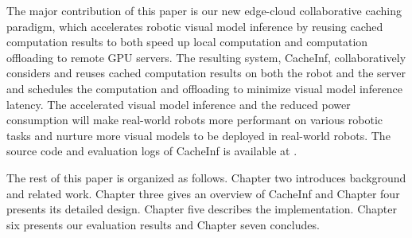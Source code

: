The major contribution of this paper is our new edge-cloud collaborative caching paradigm, which accelerates robotic visual model inference by reusing cached computation results to both speed up local computation and computation offloading to remote GPU servers.
The resulting system, CacheInf, collaboratively considers and reuses cached computation results on both the robot and the server and schedules the computation and offloading to minimize visual model inference latency.
The accelerated visual model inference and the reduced power consumption will make real-world robots more performant on various robotic tasks and nurture more visual models to be deployed in real-world robots.
The source code and evaluation logs of CacheInf is available at .

The rest of this paper is organized as follows.
Chapter two introduces background and related work.
Chapter three gives an overview of CacheInf and Chapter four presents its detailed design.
Chapter five describes the implementation.
Chapter six presents our evaluation results and Chapter seven concludes.

